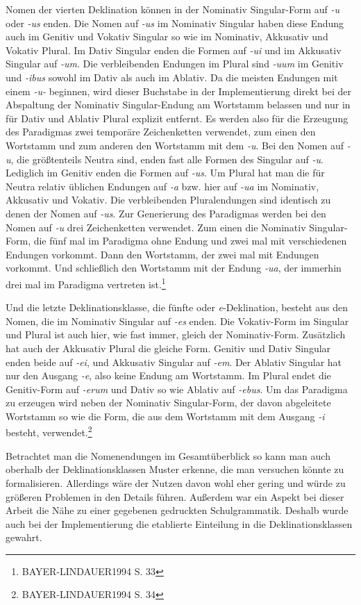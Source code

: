 \documentclass[12pt,abstract=on,titlepage,bibliography=totoc,ngerman,listof=totoc]{scrreprt}
\begin{document}
Nomen der vierten Deklination können in der Nominativ Singular-Form auf \textit{-u} oder \textit{-us} enden. Die Nomen auf \textit{-us} im Nominativ Singular haben diese Endung auch im Genitiv und Vokativ Singular so wie im Nominativ, Akkusativ und Vokativ Plural. Im Dativ Singular enden die Formen auf \textit{-ui} und im Akkusativ Singular auf \textit{-um}. Die verbleibenden Endungen im Plural sind \textit{-uum} im Genitiv und \textit{-ibus} sowohl im Dativ als auch im Ablativ. Da die meisten Endungen mit einem \textit{-u-} beginnen, wird dieser Buchstabe in der Implementierung direkt bei der Abspaltung der Nominativ Singular-Endung am Wortstamm belassen und nur in für Dativ und Ablativ Plural explizit entfernt. Es werden also für die Erzeugung des Paradigmas zwei temporäre Zeichenketten verwendet, zum einen den Wortstamm und zum anderen den Wortstamm mit dem \textit{-u}. Bei den Nomen auf \textit{-u}, die größtenteils Neutra sind, enden fast alle Formen des Singular auf \textit{-u}. Lediglich im Genitiv enden die Formen auf \textit{-us}. Um Plural hat man die für Neutra relativ üblichen Endungen auf \textit{-a} bzw. hier auf \textit{-ua} im Nominativ, Akkusativ und Vokativ. Die verbleibenden Pluralendungen sind identisch zu denen der Nomen auf \textit{-us}. Zur Generierung des Paradigmas werden bei den Nomen auf \textit{-u} drei Zeichenketten verwendet. Zum einen die Nominativ Singular-Form, die fünf mal im Paradigma ohne Endung und zwei mal mit verschiedenen Endungen vorkommt. Dann den Wortstamm, der zwei mal mit Endungen vorkommt. Und schließlich den Wortstamm mit der Endung \textit{-ua}, der immerhin drei mal im Paradigma vertreten ist.\footnote{BAYER-LINDAUER1994 S. 33} \par
Und die letzte Deklinationsklasse, die fünfte oder \textit{e}-Deklination, besteht aus den Nomen, die im Nominativ Singular auf \textit{-es} enden. Die Vokativ-Form im Singular und Plural ist auch hier, wie fast immer, gleich der Nominativ-Form. Zusätzlich hat auch der Akkusativ Plural die gleiche Form. Genitiv und Dativ Singular enden beide auf \textit{-ei}, und Akkusativ Singular auf \textit{-em}. Der Ablativ Singular hat nur den Ausgang \textit{-e}, also keine Endung am Wortstamm. Im Plural endet die Genitiv-Form auf \textit{-erum} und Dativ so wie Ablativ auf \textit{-ebus}. Um das Paradigma zu erzeugen wird neben der Nominativ Singular-Form, der davon abgeleitete Wortstamm so wie die Form, die aus dem Wortstamm mit dem Ausgang \textit{-i} besteht, verwendet.\footnote{BAYER-LINDAUER1994 S. 34} \par
Betrachtet man die Nomenendungen im Gesamtüberblick so kann man auch oberhalb der Deklinationsklassen Muster erkenne, die man versuchen könnte zu formalisieren. Allerdings wäre der Nutzen davon wohl eher gering und würde zu größeren Problemen in den Details führen. Außerdem war ein Aspekt bei dieser Arbeit die Nähe zu einer gegebenen gedruckten Schulgrammatik. Deshalb wurde auch bei der Implementierung die etablierte Einteilung in die Deklinationsklassen gewahrt.
\end{document}
